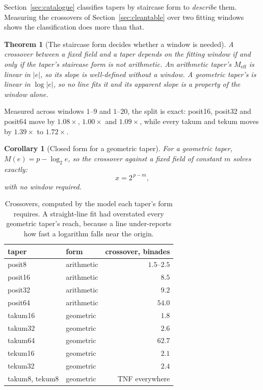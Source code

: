 \documentclass[11pt]{article}
\newtheorem{theorem}{Theorem}
\newtheorem{corollary}{Corollary}
\theoremstyle{definition}
\begin{document}
Section~\ref{sec:catalogue} classifies tapers by staircase form to \emph{describe}
them. Measuring the crossovers of Section~\ref{sec:cleantable} over two fitting
windows shows the classification does more than that.

\begin{theorem}[The staircase form decides whether a window is needed]
\label{thm:formwindow}
A crossover between a fixed field and a taper depends on the fitting window if
and only if the taper's staircase form is not arithmetic. An arithmetic taper's
$M_{\mathrm{eff}}$ is linear in $|e|$, so its slope is well-defined without a
window. A geometric taper's is linear in $\log|e|$, so no line fits it and its
apparent slope is a property of the window alone.
\end{theorem}

Measured across windows $1$--$9$ and $1$--$20$, the split is exact: posit16,
posit32 and posit64 move by $1.08\times$, $1.00\times$ and $1.09\times$, while
every takum and tekum moves by $1.39\times$ to $1.72\times$.

\begin{corollary}[Closed form for a geometric taper]
\label{cor:geomcross}
For a geometric taper, $M(e) = p - \log_2 e$, so the crossover against a fixed
field of constant $m$ solves exactly:
\[
  x = 2^{\,p-m},
\]
with no window required.
\end{corollary}

\begin{table}[t]\centering
\caption{Crossovers, computed by the model each taper's form requires. A
straight-line fit had overstated every geometric taper's reach, because a line
under-reports how fast a logarithm falls near the origin.}
\label{tab:crosscorrected}
\begin{tabular}{llr}
\toprule
taper & form & crossover, binades \\
\midrule
posit8 & arithmetic & $1.5$--$2.5$ \\
posit16 & arithmetic & $8.5$ \\
posit32 & arithmetic & $9.2$ \\
posit64 & arithmetic & $54.0$ \\
takum16 & geometric & $\mathbf{1.8}$ \\
takum32 & geometric & $\mathbf{2.6}$ \\
takum64 & geometric & $\mathbf{62.7}$ \\
tekum16 & geometric & $\mathbf{2.1}$ \\
tekum32 & geometric & $\mathbf{2.4}$ \\
takum8, tekum8 & geometric & TNF everywhere \\
\bottomrule
\end{tabular}
\end{table}
\end{document}
